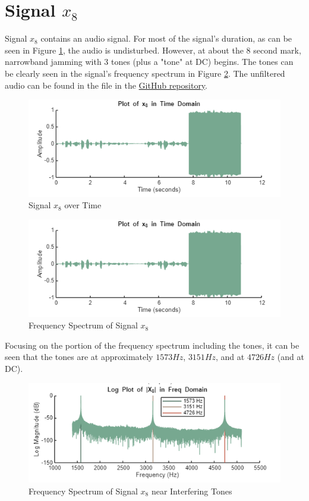 
\section{Signal $x_8$}

Signal $x_8$ contains an audio signal.  For most of the signal's duration, as can be seen in Figure \ref{fig:x8}, the audio is undisturbed.  However, at about the 8 second mark, narrowband jamming with 3 tones (plus a "tone" at DC) begins.  The tones can be clearly seen in the signal's frequency spectrum in Figure \ref{fig:X8}.  The unfiltered audio can be found in the  file in the \href{https://github.com/dbcometto/ece434_cpx2}{GitHub repository}.

\begin{figure}[H]
    \centering
    \includegraphics[width=0.5\linewidth]{figures/x8_prefilter.png}
    \caption{Signal $x_8$ over Time}
    \label{fig:x8}
\end{figure}

\begin{figure}[H]
    \centering
    \includegraphics[width=0.5\linewidth]{figures/X8_prefilter.png}
    \caption{Frequency Spectrum of Signal $x_8$}
    \label{fig:X8}
\end{figure}

Focusing on the portion of the frequency spectrum including the tones, it can be seen that the tones are at approximately $1573 \unit{Hz}$, $3151 \unit{Hz}$, and at $4726 \unit{Hz}$ (and at DC).
\begin{figure}[H]
    \centering
    \includegraphics[width=0.5\linewidth]{figures/X8_prefilter_zoom.png}
    \caption{Frequency Spectrum of Signal $x_8$ near Interfering Tones}
    \label{fig:enter-label}
\end{figure}

